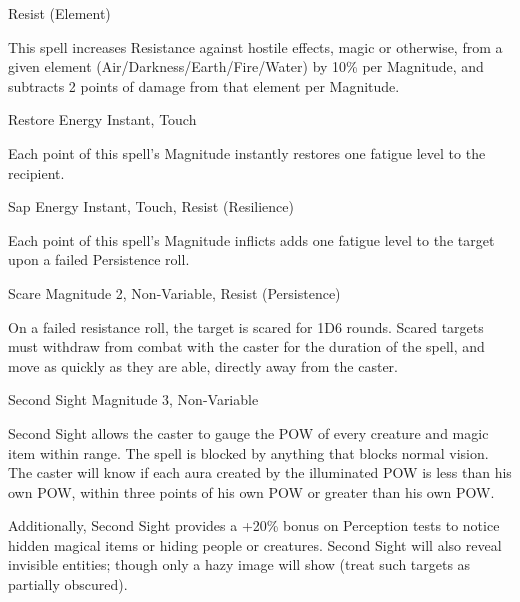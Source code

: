 \begin{rpg-spell}
{Resist (Element)}
\nopagebreak
{}

This spell increases Resistance against hostile effects, magic or otherwise, from a given element (Air/Darkness/Earth/Fire/Water) by 10\% per Magnitude, and subtracts 2 points of damage from that element per Magnitude.
\end{rpg-spell}


\begin{rpg-spell}
{Restore Energy}
{Instant, Touch}

Each point of this spell’s Magnitude instantly restores one fatigue level to the recipient.
\end{rpg-spell}


\begin{rpg-spell}
{Sap Energy}
{Instant, Touch, Resist (Resilience)}

Each point of this spell’s Magnitude inflicts adds one fatigue level to the target upon a failed Persistence roll.
\end{rpg-spell}


\begin{rpg-spell}
{Scare}
{Magnitude 2, Non-Variable, Resist (Persistence)}

On a failed resistance roll, the target is scared for 1D6 rounds. Scared targets must withdraw from combat with the caster for the duration of the spell, and move as quickly as they are able, directly away from the caster.
\end{rpg-spell}


\begin{rpg-spell}
{Second Sight}
{Magnitude 3, Non-Variable}

Second Sight allows the caster to gauge the POW of every creature and magic item within range. The spell is blocked by anything that blocks normal vision. The caster will know if each aura created by the illuminated POW is less than his own POW, within three points of his own POW or greater than his own POW. 

Additionally, Second Sight provides a +20\% bonus on Perception tests to notice hidden magical items or hiding people or creatures. Second Sight will also reveal invisible entities; though only a hazy image will show (treat such targets as partially obscured). 
\end{rpg-spell}


